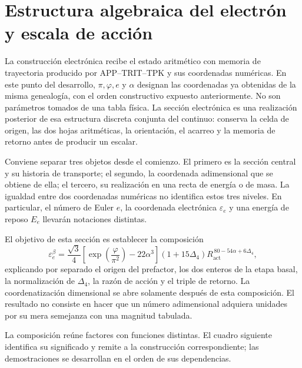 \section{Estructura algebraica del electrón y escala de acción}
\label{sec:electron}

La construcción electrónica recibe el estado aritmético con memoria de
trayectoria producido por APP--TRIT--TPK y sus coordenadas numéricas. En este punto del desarrollo,
\(\pi,\varphi,e\) y \(\alpha\) designan las coordenadas ya obtenidas de
la misma genealogía, con el orden constructivo expuesto anteriormente. No
son parámetros tomados de una tabla física. La sección electrónica es una
realización posterior de esa estructura discreta conjunta del continuo:
conserva la celda de origen, las dos hojas aritméticas, la orientación, el
acarreo y la memoria de retorno antes de producir un escalar.

Conviene separar tres objetos desde el comienzo. El primero es la sección
central y su historia de transporte; el segundo, la coordenada
adimensional que se obtiene de ella; el tercero, su realización en una
recta de energía o de masa. La igualdad entre dos coordenadas numéricas no
identifica estos tres niveles. En particular, el número de Euler \(e\),
la coordenada electrónica \(\varepsilon_e\) y una energía de reposo
\(E_e\) llevarán notaciones distintas.

El objetivo de esta sección es establecer la composición
\begin{equation}
 \varepsilon_e^{\beta}
 =\frac{\sqrt3}{4}
  \left[\exp\!\left(\frac{\varphi}{\pi^2}\right)-22\alpha^3\right]
  (1+15\Delta_4)
  R_{\mathrm{act}}^{\,80-54\alpha+6\Delta_4},
 \label{eq:el-formula-completa}
\end{equation}
explicando por separado el origen del prefactor, los dos enteros de la
etapa basal, la normalización de \(\Delta_4\), la razón de acción y el
triple de retorno. La coordenatización dimensional se abre solamente después de
esta composición. El resultado no consiste en hacer que un número
adimensional adquiera unidades por su mera semejanza con una magnitud
tabulada.

La composición reúne factores con funciones distintas. El cuadro
siguiente identifica su significado y remite a la construcción
correspondiente; las demostraciones se desarrollan en el orden de sus
dependencias.

